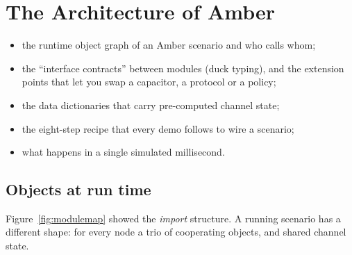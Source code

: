 \chapter{The Architecture of Amber}
\label{ch:architecture}

\begin{defbox}
\begin{itemize}
 \item the runtime object graph of an Amber scenario and who calls whom;
 \item the ``interface contracts'' between modules (duck typing), and the extension points that let you swap a capacitor, a protocol or a policy;
 \item the data dictionaries that carry pre-computed channel state;
 \item the eight-step recipe that every demo follows to wire a scenario;
 \item what happens in a single simulated millisecond.
\end{itemize}
\end{defbox}

\section{Objects at run time}
\label{sec:objects}

Figure~\ref{fig:modulemap} showed the \emph{import} structure. A running scenario has a different shape: for every node a trio of cooperating objects, and shared channel state.

